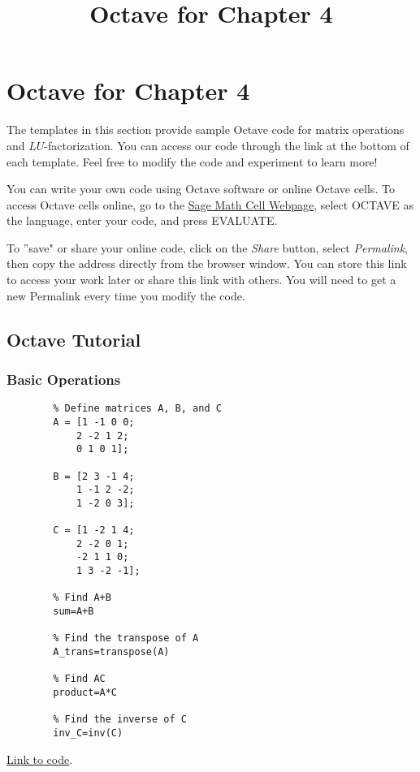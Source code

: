 \documentclass{ximera}
\title{Octave for Chapter 4} \license{CC BY-NC-SA 4.0}
\begin{document}
\begin{abstract}
\end{abstract}
\maketitle

\section*{Octave for Chapter 4}
The templates in this section provide sample Octave code for matrix operations and $LU$-factorization. You can access our code through the link at the bottom of each template.  Feel free to modify the code and experiment to learn more!  

You can write your own code using Octave software or online Octave cells.  To access Octave cells online, go to the \href{https://sagecell.sagemath.org/}{Sage Math Cell Webpage}, select OCTAVE as the language, enter your code, and press EVALUATE.  

To ''save" or share your online code, click on the \emph{Share} button, select \emph{Permalink}, then copy the address directly from the browser window.  You can store this link to access your work later or share this link with others.  You will need to get a new Permalink every time you modify the code.

\subsection*{Octave Tutorial}
\subsubsection*{Basic Operations}

\begin{template}\label{temp:matrixOps}

    \begin{verbatim}
        % Define matrices A, B, and C
        A = [1 -1 0 0;
            2 -2 1 2;
            0 1 0 1];
            
        B = [2 3 -1 4;
            1 -1 2 -2;
            1 -2 0 3];   
            
        C = [1 -2 1 4;
            2 -2 0 1;
            -2 1 1 0;
            1 3 -2 -1];     
            
        % Find A+B
        sum=A+B

        % Find the transpose of A
        A_trans=transpose(A)

        % Find AC
        product=A*C

        % Find the inverse of C
        inv_C=inv(C)
    \end{verbatim}
    
    \href{https://sagecell.sagemath.org/?z=eJxdUEsOgyAU3Jtwh9mYaD-JoDvDAml6iaZpjGLqwk-U9vx90GptWRBmhpnhEeJkmrY36Eo7tZWZoQ4oDij7GpoFChIXjiNHgiRnAdwSOApwiAUncDK_LpgFhbMJpM6YLbSPcd4NIciYXnNv-nj1p9JVZD-V1LFgr_Lvk7jrokvcZ23SQpxbGkXtCxbMj076w0rbu4Gdyn4eh9lgaKBo5Jtn5MpHKt5YFP3KOA31o7JS7fRfWNs_zfSOIonQTUvaIx2_APV4TSE=&lang=octave&interacts=eJyLjgUAARUAuQ==}{Link to code}.
    \end{template}
    
\end{document}
